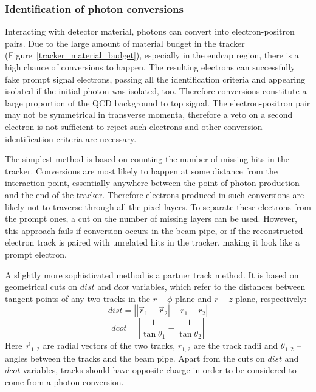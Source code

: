 \subsubsection{Identification of photon conversions}
\label{sss:photon_conversions}
Interacting with detector material, photons can convert into electron-positron pairs. Due to the large amount of
material budget in the tracker (Figure~\ref{tracker_material_budget}), especially in the endcap region, there is a high
chance of conversions to happen. The resulting electrons can successfully fake prompt signal electrons, passing all the
identification criteria and appearing isolated if the initial photon was isolated, too. Therefore conversions constitute
a large proportion of the QCD background to top signal. The electron-positron pair may not be symmetrical in transverse
momenta, therefore a veto on a second electron is not sufficient to reject such electrons and other conversion
identification criteria are necessary.

The simplest method is based on counting the number of missing hits in the tracker. Conversions are most likely to
happen at some distance from the interaction point, essentially anywhere between the point of photon production and the
end of the tracker. Therefore electrons produced in such conversions are likely not to traverse through all the pixel
layers. To separate these electrons from the prompt ones, a cut on the number of missing layers can be used. However,
this approach fails if conversion occurs in the beam pipe, or if the reconstructed electron track is paired with
unrelated hits in the tracker, making it look like a prompt electron.

A slightly more sophisticated method is a partner track method. It is based on geometrical cuts on $dist$ and $dcot$
variables, which refer to the distances between tangent points of any two tracks in the $r-\phi$-plane and $r-z$-plane,
respectively:
\begin{equation}
  dist = \left|\left|\vec{r}_1 - \vec{r}_2 \right|- r_1 - r_2\right|
\end{equation}
\begin{equation}
  dcot = \left|\frac{1}{\tan\theta_1} -\frac{1}{\tan\theta_2}\right|
\end{equation}
Here $\vec{r}_{1,2}$ are radial vectors of the two tracks, $r_{1,2}$ are the track radii and $\theta_{1,2}$ -- angles
between the tracks and the beam pipe. Apart from the cuts on $dist$ and $dcot$ variables, tracks should have opposite
charge in order to be considered to come from a photon conversion.

